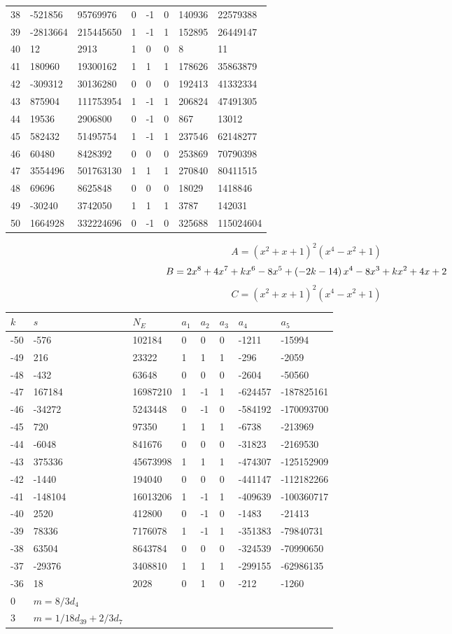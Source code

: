 \documentclass{amsart}
\begin{document}
\begin{longtable}{|l|l|l|lllll|}
38&-521856&95769976&0&-1&0&140936&22579388\\
39&-2813664&215445650&1&-1&1&152895&26449147\\
40&12&2913&1&0&0&8&11\\
41&180960&19300162&1&1&1&178626&35863879\\
42&-309312&30136280&0&0&0&192413&41332334\\
43&875904&111753954&1&-1&1&206824&47491305\\
44&19536&2906800&0&-1&0&867&13012\\
45&582432&51495754&1&-1&1&237546&62148277\\
46&60480&8428392&0&0&0&253869&70790398\\
47&3554496&501763130&1&1&1&270840&80411515\\
48&69696&8625848&0&0&0&18029&1418846\\
49&-30240&3742050&1&1&1&3787&142031\\
50&1664928&332224696&0&-1&0&325688&115024604\\
\hline
\end{longtable}
$$A=(x^2
 + x
 + 1)^{2}(x^4
 - x^2
 + 1)$$
$$B=2\*x^8
 + 4\*x^7
 + k\*x^6
 - 8\*x^5
 + \left(-2\*k
 - 14\right) \*x^4
 - 8\*x^3
 + k\*x^2
 + 4\*x
 + 2$$
$$C=(x^2
 + x
 + 1)^{2}(x^4
 - x^2
 + 1)$$
\begin{longtable}{|l|l|l|lllll|}
\hline
$k$ & $s$ & $N_E$ & $a_1$ & $a_2$ & $a_3$ & $a_4$ & $a_5$\\
\hline
-50&-576&102184&0&0&0&-1211&-15994\\
-49&216&23322&1&1&1&-296&-2059\\
-48&-432&63648&0&0&0&-2604&-50560\\
-47&167184&16987210&1&-1&1&-624457&-187825161\\
-46&-34272&5243448&0&-1&0&-584192&-170093700\\
-45&720&97350&1&1&1&-6738&-213969\\
-44&-6048&841676&0&0&0&-31823&-2169530\\
-43&375336&45673998&1&1&1&-474307&-125152909\\
-42&-1440&194040&0&0&0&-441147&-112182266\\
-41&-148104&16013206&1&-1&1&-409639&-100360717\\
-40&2520&412800&0&-1&0&-1483&-21413\\
-39&78336&7176078&1&-1&1&-351383&-79840731\\
-38&63504&8643784&0&0&0&-324539&-70990650\\
-37&-29376&3408810&1&1&1&-299155&-62986135\\
-36&18&2028&0&1&0&-212&-1260\\
0&$m=8/3d_{4}$&&\multicolumn{5}{c|}{}\\
3&$m=1/18d_{39}+2/3d_{7}$&&\multicolumn{5}{c|}{}\\
\hline
\end{longtable}
\end{document}
